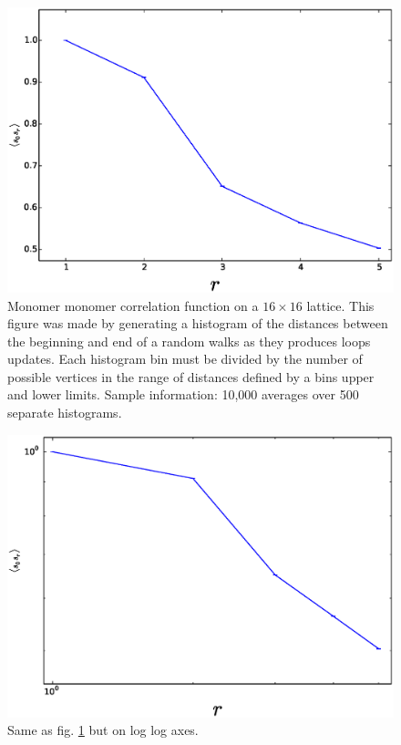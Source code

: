 \documentclass[aps,floatfix,11pt]{revtex4-1}
\begin{document}
\begin{figure}[h]
    \centering
    \includegraphics[width=8.5 cm]{mon_mon_sep_cor_normal_16x16}
    \caption{Monomer monomer correlation function on a $16\times 16$ lattice. This figure was made
    by generating a histogram of the distances between the beginning and end of a random walks as
    they produces loops updates. Each histogram bin must be divided by the number of possible vertices
    in the range of distances defined by a bins upper and lower limits. Sample information: 10,000
    averages over 500 separate histograms. \label{fig:mon_mon_sep_cor_normal_16x16}}
\end{figure}

\begin{figure}[h]
    \centering
    \includegraphics[width=8.5 cm]{mon_mon_sep_cor_loglog_16x16}
    \caption{Same as fig. \ref{fig:mon_mon_sep_cor_normal_16x16} but on log log axes. \label{mon_mon_sep_cor_loglog_16x16}}
\end{figure}


\clearpage
\end{document}
